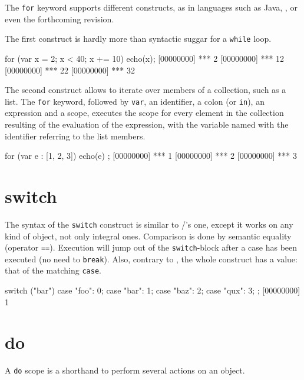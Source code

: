 The \lstinline{for} keyword supports different constructs, as in
languages such as Java, \Cs, or even the forthcoming \Cxx revision.

The first construct is hardly more than syntactic suggar for a
\lstinline{while} loop.

\begin{urbiscript}[firstnumber=last]
for (var x = 2; x < 40; x += 10)
  echo(x);
[00000000] *** 2
[00000000] *** 12
[00000000] *** 22
[00000000] *** 32
\end{urbiscript}

The second construct allows to iterate over members of a collection,
such as a list. The \lstinline{for} keyword, followed by
\lstinline|var|, an identifier, a colon (or \lstinline|in|), an
expression and a scope, executes the scope for every element in the
collection resulting of the evaluation of the expression, with the
variable named with the identifier referring to the list members.

\begin{urbiscript}[firstnumber=last]
for (var e : [1, 2, 3]) { echo(e) };
[00000000] *** 1
[00000000] *** 2
[00000000] *** 3
\end{urbiscript}

\section{switch}

The syntax of the \lstinline|switch| construct is similar to \C/\Cxx's
one, except it works on any kind of object, not only integral
ones. Comparison is done by semantic equality (operator
\lstinline{==}). Execution will jump out of the
\lstinline|switch|-block after a case has been executed (no need to
\lstinline{break}).  Also, contrary to \Cxx, the whole construct has a
value: that of the matching \lstinline{case}.

\begin{urbiscript}[firstnumber=last]
switch ("bar")
{
  case "foo":  0;
  case "bar":  1;
  case "baz":  2;
  case "qux":  3;
};
[00000000] 1
\end{urbiscript}

\section{do}
\label{section:constructs:do}

A \lstinline|do| scope is a shorthand to perform several actions on an
object.


